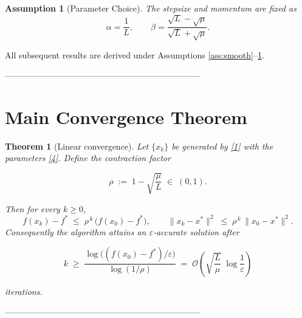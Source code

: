 \documentclass{article}
\newtheorem{theorem}{Theorem}
\newtheorem{assumption}{Assumption}
\begin{document}
\begin{assumption}[Parameter Choice]\label{ass:param}
The stepsize and momentum are fixed as  
\[
\alpha=\frac{1}{L},\qquad 
\beta=\frac{\sqrt{L}-\sqrt{\mu}}{\sqrt{L}+\sqrt{\mu}}.
\tag{4}
\]
\end{assumption}

All subsequent results are derived under Assumptions \ref{ass:smooth}–\ref{ass:param}.

---------------------------------------------------------------------

\section*{Main Convergence Theorem}
\begin{theorem}[Linear convergence]\label{thm:linear}
Let $\{x_{k}\}$ be generated by \eqref{1} with the parameters \eqref{4}.  
Define the contraction factor  

\[
\rho \;:=\; 1-\sqrt{\frac{\mu}{L}}\;\in\;(0,1).
\]

Then for every $k\ge 0$,
\[
f(x_{k})-f^{\ast}\;\le\;\rho^{\,k}\,\bigl(f(x_{0})-f^{\ast}\bigr),
\qquad 
\|x_{k}-x^{\ast}\|^{2}\;\le\;\rho^{\,k}\,\|x_{0}-x^{\ast}\|^{2}.
\tag{5}
\]
Consequently the algorithm attains an $\varepsilon$‑accurate solution after  

\[
k\;\ge\;\frac{\log\bigl((f(x_{0})-f^{\ast})/\varepsilon\bigr)}{\log(1/\rho)}
\;=\; \mathcal{O}\!\left(\sqrt{\frac{L}{\mu}}\;\log\frac{1}{\varepsilon}\right)
\]

iterations.
\end{theorem}

---------------------------------------------------------------------
\end{document}
